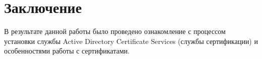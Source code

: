 \section{Заключение}
    В результате данной работы было проведено ознакомление с процессом  установки службы Active Directory Certificate Services (службы сертификации) и особенностями работы с сертификатами.\par

